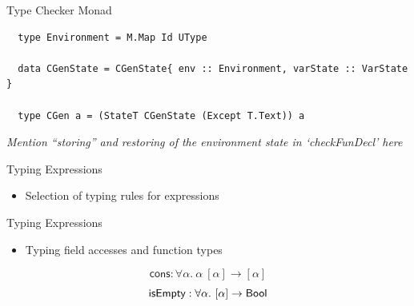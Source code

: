 \documentclass[dvipsnames,aspectratio=169]{beamer}
\begin{document}
\begin{frame}[fragile]{Type Checker Monad}

  \begin{verbatim}
  type Environment = M.Map Id UType

  data CGenState = CGenState{ env :: Environment, varState :: VarState }

  type CGen a = (StateT CGenState (Except T.Text)) a
  \end{verbatim}

  \emph{Mention ``storing'' and restoring of the environment state in `checkFunDecl'
  here}

\end{frame}


\begin{frame}{Typing Expressions}

  \begin{itemize}
    \item Selection of typing rules for expressions
  \end{itemize}


\end{frame}


\begin{frame}{Typing Expressions}

  \begin{itemize}
    \item Typing field accesses and function types
  \end{itemize}


  \[ \textsf{cons} : \forall \alpha.\ \alpha\ [\alpha] \to [\alpha] \]
  \[ \textsf{isEmpty} : \forall \alpha.\ [\alpha] \to \Bool \]

\end{frame}
\end{document}
